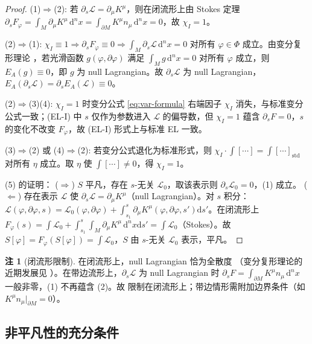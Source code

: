 \documentclass[12pt,a4paper]{article}
\theoremstyle{definition}
\newtheorem{remark}[theorem]{注}
\newcommand{\mL}{\mathcal{L}}
\newcommand{\mPhi}{\Phi}
\newcommand{\diff}{\mathrm{d}}
\newcommand{\chiI}{\chi_I}
\newcommand{\dVol}{\,\diff^n x}
\begin{document}
\begin{proof}
(1)$\Rightarrow$(2): 若 $\partial_s \mL = \partial_\mu K^\mu$，则在闭流形上由 Stokes 定理 $\partial_s F_\varphi = \int_M \partial_\mu K^\mu \dVol = \int_{\partial M} K^\mu n_\mu \dVol = 0$，故 $\chiI = 1$。

(2)$\Rightarrow$(1): $\chiI \equiv 1 \Rightarrow \partial_s F_\varphi \equiv 0 \Rightarrow \int_M \partial_s \mL \dVol = 0$ 对所有 $\varphi \in \mPhi$ 成立。由变分复形理论 \cite[定理 4.7]{Olver1993}，若光滑函数 $g(\varphi, \partial\varphi)$ 满足 $\int_M g \dVol = 0$ 对所有 $\varphi$ 成立，则 $E_A(g) \equiv 0$，即 $g$ 为 null Lagrangian。故 $\partial_s \mL$ 为 null Lagrangian，$E_A(\partial_s \mL) = \partial_s E_A(\mL) \equiv 0$。

(2)$\Rightarrow$(3)(4): $\chiI = 1$ 时变分公式 \eqref{eq:var-formula} 右端因子 $\chiI$ 消失，与标准变分公式一致；(EL-I) 中 $s$ 仅作为参数进入 $\mL$ 的偏导数，但 $\chiI = 1$ 蕴含 $\partial_s F = 0$，$s$ 的变化不改变 $F_\varphi$，故 (EL-I) 形式上与标准 EL 一致。

(3)$\Rightarrow$(2) 或 (4)$\Rightarrow$(2): 若变分公式退化为标准形式，则 $\chiI \cdot \int[\cdots] = \int[\cdots]_{\mathrm{std}}$ 对所有 $\eta$ 成立。取 $\eta$ 使 $\int[\cdots] \neq 0$，得 $\chiI = 1$。

(5) 的证明：
($\Rightarrow$) $S$ 平凡，存在 $s$-无关 $\mL_0$，取该表示则 $\partial_s \mL_0 = 0$，(1) 成立。
($\Leftarrow$) 存在表示 $\mL$ 使 $\partial_s \mL = \partial_\mu K^\mu$（null Lagrangian）。对 $s$ 积分：$\mL(\varphi, \partial\varphi, s) = \mL_0(\varphi, \partial\varphi) + \int_{s_1}^s \partial_\mu K^\mu(\varphi, \partial\varphi, s') \diff s'$。在闭流形上 $F_\varphi(s) = \int \mL_0 + \int_{s_1}^s \int_M \partial_\mu K^\mu \dVol \diff s' = \int \mL_0$（Stokes）。故 $S[\varphi] = F_\varphi(S[\varphi]) = \int \mL_0$，$S$ 由 $s$-无关 $\mL_0$ 表示，平凡。
\end{proof}

\begin{remark}[闭流形限制]
\label{rem:closed-M}
在闭流形上，null Lagrangian 恰为全散度 \cite{Olver1993}（变分复形理论的近期发展见 \cite{Saunders2024}）。在带边流形上，$\partial_s \mL$ 为 null Lagrangian 时 $\partial_s F = \int_{\partial M} K^\mu n_\mu \dVol$ 一般非零，(1) 不再蕴含 (2)。故  限制在闭流形上；带边情形需附加边界条件（如 $K^\mu n_\mu|_{\partial M} = 0$）。
\end{remark}

\subsection{非平凡性的充分条件}
\end{document}
